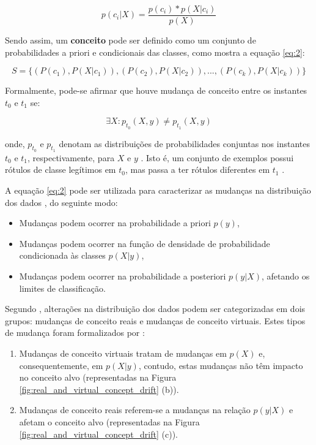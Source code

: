 \documentclass[qual, classic, a4paper]{ufbathesis}
\begin{document}
\begin{equation} \label{eq:1}
p(c_i|X) = \frac{p(c_i) * p(X|c_i)}{p(X)}
\end{equation}

Sendo assim, um \textbf{conceito} pode ser definido como um conjunto de probabilidades a priori e condicionais das classes, como mostra a equação \ref{eq:2}:

\begin{equation} \label{eq:2}
    S = \{(P(c_1), P(X|c_1)), (P(c_2), P(X|c_2)), ..., (P(c_k), P(X|c_k))\}
\end{equation}

Formalmente, pode-se afirmar que houve mudança de conceito entre os instantes $t_0$ e $t_1$ se:

\begin{equation} \label{eq:3}
    {\exists}X : p_{t_0}(X, y) \ne p_{t_1}(X, y)
\end{equation}

onde, $p_{t_0}$ e $p_{t_1}$ denotam as distribuições de probabilidades conjuntas nos instantes $t_0$ e $t_1$, respectivamente, 
para $X$ e $y$ \cite{Gama:2014:SCD:2597757.2523813}. 
Isto é, um conjunto de exemplos possui rótulos de classe legítimos em $t_0$, mas passa a ter rótulos diferentes em $t_1$ \cite{Kolter:2007:DWM:1314498.1390333}.

A equação \ref{eq:2} pode ser utilizada para caracterizar as mudanças na distribuição dos dados \cite{Gao:2007, Gama:2014:SCD:2597757.2523813}, do seguinte modo:

\begin{itemize}
    \item Mudanças podem ocorrer na probabilidade a priori $p(y)$,
    \item Mudanças podem ocorrer na função de densidade de probabilidade condicionada às classes $p(X|y)$,
    \item Mudanças podem ocorrer na probabilidade a posteriori $p(y|X)$, afetando os limites de classificação.
\end{itemize}

Segundo \cite{Widmer:1996:LPC:226791.226798}, alterações na distribuição dos dados podem ser categorizadas em dois grupos:
mudanças de conceito reais e mudanças de conceito virtuais.
Estes tipos de mudança foram formalizados por \cite{Zliobaite:2010, Gama:2014:SCD:2597757.2523813}:

\begin{enumerate}
    \item Mudanças de conceito virtuais tratam de mudanças em $p(X)$ e, consequentemente, em $p(X|y)$,
    contudo, estas mudanças não têm impacto no conceito alvo (representadas na Figura \ref{fig:real_and_virtual_concept_drift} (b)).
    \item Mudanças de conceito reais referem-se a mudanças na relação $p(y|X)$ e afetam o conceito alvo (representadas na Figura \ref{fig:real_and_virtual_concept_drift} (c)).
\end{enumerate}
\end{document}
